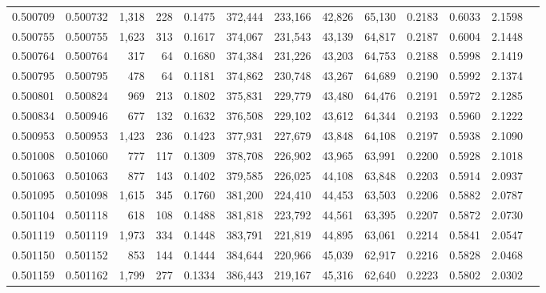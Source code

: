 \begin{tabular}{rrrrrrrrrrrrr}
0.500709 & 0.500732 & 1,318 &   228 &                                     0.1475 & 372,444 & 233,166 &  42,826 &  65,130 & 0.2183 & 0.6033 & 2.1598 \\
0.500755 & 0.500755 & 1,623 &   313 &                                     0.1617 & 374,067 & 231,543 &  43,139 &  64,817 & 0.2187 & 0.6004 & 2.1448 \\
0.500764 & 0.500764 &   317 &    64 &                                     0.1680 & 374,384 & 231,226 &  43,203 &  64,753 & 0.2188 & 0.5998 & 2.1419 \\
0.500795 & 0.500795 &   478 &    64 &                                     0.1181 & 374,862 & 230,748 &  43,267 &  64,689 & 0.2190 & 0.5992 & 2.1374 \\
0.500801 & 0.500824 &   969 &   213 &                                     0.1802 & 375,831 & 229,779 &  43,480 &  64,476 & 0.2191 & 0.5972 & 2.1285 \\
0.500834 & 0.500946 &   677 &   132 &                                     0.1632 & 376,508 & 229,102 &  43,612 &  64,344 & 0.2193 & 0.5960 & 2.1222 \\
0.500953 & 0.500953 & 1,423 &   236 &                                     0.1423 & 377,931 & 227,679 &  43,848 &  64,108 & 0.2197 & 0.5938 & 2.1090 \\
0.501008 & 0.501060 &   777 &   117 &                                     0.1309 & 378,708 & 226,902 &  43,965 &  63,991 & 0.2200 & 0.5928 & 2.1018 \\
0.501063 & 0.501063 &   877 &   143 &                                     0.1402 & 379,585 & 226,025 &  44,108 &  63,848 & 0.2203 & 0.5914 & 2.0937 \\
0.501095 & 0.501098 & 1,615 &   345 &                                     0.1760 & 381,200 & 224,410 &  44,453 &  63,503 & 0.2206 & 0.5882 & 2.0787 \\
0.501104 & 0.501118 &   618 &   108 &                                     0.1488 & 381,818 & 223,792 &  44,561 &  63,395 & 0.2207 & 0.5872 & 2.0730 \\
0.501119 & 0.501119 & 1,973 &   334 &                                     0.1448 & 383,791 & 221,819 &  44,895 &  63,061 & 0.2214 & 0.5841 & 2.0547 \\
0.501150 & 0.501152 &   853 &   144 &                                     0.1444 & 384,644 & 220,966 &  45,039 &  62,917 & 0.2216 & 0.5828 & 2.0468 \\
0.501159 & 0.501162 & 1,799 &   277 &                                     0.1334 & 386,443 & 219,167 &  45,316 &  62,640 & 0.2223 & 0.5802 & 2.0302 \\

\end{tabular}
